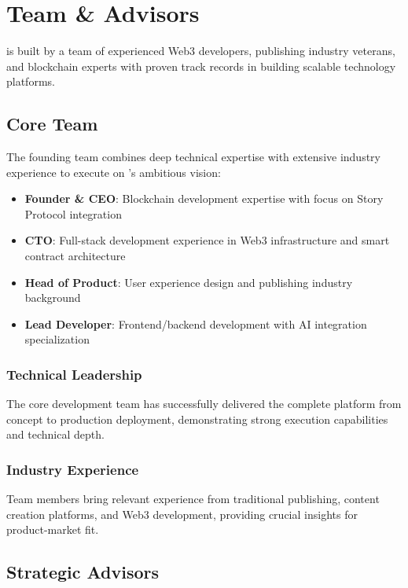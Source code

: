\section{Team \& Advisors}
\label{sec:team-advisors}

\storyhouse{} is built by a team of experienced Web3 developers, publishing industry veterans, and blockchain experts with proven track records in building scalable technology platforms.

\subsection{Core Team}

The founding team combines deep technical expertise with extensive industry experience to execute on \storyhouse{}'s ambitious vision:

\begin{itemize}
    \item \textbf{Founder \& CEO}: Blockchain development expertise with focus on Story Protocol integration
    \item \textbf{CTO}: Full-stack development experience in Web3 infrastructure and smart contract architecture
    \item \textbf{Head of Product}: User experience design and publishing industry background
    \item \textbf{Lead Developer}: Frontend/backend development with AI integration specialization
\end{itemize}

\subsubsection{Technical Leadership}

The core development team has successfully delivered the complete \storyhouse{} platform from concept to production deployment, demonstrating strong execution capabilities and technical depth.

\subsubsection{Industry Experience}

Team members bring relevant experience from traditional publishing, content creation platforms, and Web3 development, providing crucial insights for product-market fit.

\subsection{Strategic Advisors}

